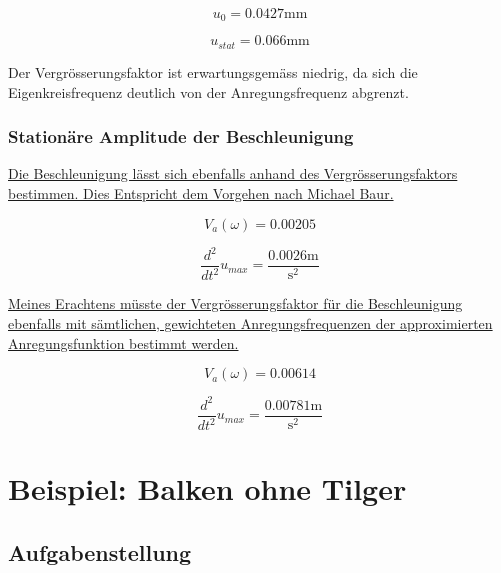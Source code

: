 \documentclass[
  letterpaper,
  DIV=11]{scrreprt}
\begin{document}
\begin{equation}u_{0} = 0.0427 \text{mm}\end{equation}

\begin{equation}u_{stat} = 0.066 \text{mm}\end{equation}

Der Vergrösserungsfaktor ist erwartungsgemäss niedrig, da sich die
Eigenkreisfrequenz deutlich von der Anregungsfrequenz abgrenzt.

\hypertarget{stationuxe4re-amplitude-der-beschleunigung}{%
\subsection{Stationäre Amplitude der
Beschleunigung}\label{stationuxe4re-amplitude-der-beschleunigung}}

\ul{Die Beschleunigung lässt sich ebenfalls anhand des
Vergrösserungsfaktors bestimmen. Dies Entspricht dem Vorgehen nach
Michael Baur.}

\begin{equation}V_{a}{\left(\omega \right)} = 0.00205\end{equation}

\begin{equation}\frac{d^{2}}{d t^{2}} u_{max} = \frac{0.0026 \text{m}}{\text{s}^{2}}\end{equation}

\ul{Meines Erachtens müsste der Vergrösserungsfaktor für die
Beschleunigung ebenfalls mit sämtlichen, gewichteten Anregungsfrequenzen
der approximierten Anregungsfunktion bestimmt werden.}

\begin{equation}V_{a}{\left(\omega \right)} = 0.00614\end{equation}

\begin{equation}\frac{d^{2}}{d t^{2}} u_{max} = \frac{0.00781 \text{m}}{\text{s}^{2}}\end{equation}

\hypertarget{sec-ems_untilg}{%
\chapter{Beispiel: Balken ohne Tilger}\label{sec-ems_untilg}}

\hypertarget{aufgabenstellung-9}{%
\section{Aufgabenstellung}\label{aufgabenstellung-9}}
\end{document}
